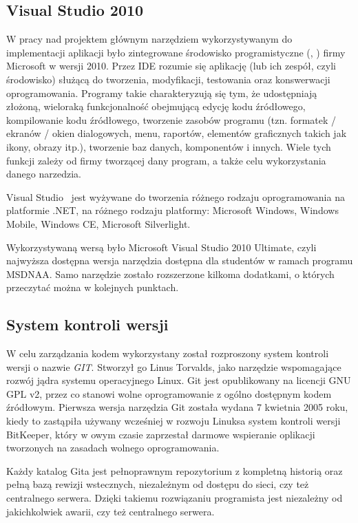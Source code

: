 \subsection{Visual Studio 2010}
W pracy nad projektem głównym narzędziem wykorzystywanym do implementacji aplikacji było zintegrowane środowisko programistyczne (, ) firmy Microsoft w wersji 2010. Przez IDE rozumie się aplikację (lub ich zespół, czyli środowisko) służącą do tworzenia, modyfikacji, testowania oraz konswerwacji oprogramowania. Programy takie charakteryzują się tym, że udostępniają złożoną, wieloraką funkcjonalność obejmującą edycję kodu źródłowego, kompilowanie kodu źródłowego, tworzenie zasobów programu (tzn. formatek / ekranów / okien dialogowych, menu, raportów, elementów graficznych takich jak ikony, obrazy itp.), tworzenie baz danych, komponentów i innych. Wiele tych funkcji zależy od firmy tworzącej dany program, a także celu wykorzystania danego narzedzia.

Visual Studio~\cite{ms:visualStudio} jest wyżywane do tworzenia różnego rodzaju oprogramowania na platformie .NET, na różnego rodzaju platformy: Microsoft Windows, Windows Mobile, Windows CE, Microsoft Silverlight.

Wykorzystywaną wersą było Microsoft Visual Studio 2010 Ultimate, czyli najwyższa dostępna wersja narzędzia dostępna dla studentów w ramach programu MSDNAA. Samo narzędzie zostało rozszerzone kilkoma dodatkami, o których przeczytać można w kolejnych punktach.

\subsection{System kontroli wersji}
W celu zarządzania kodem wykorzystany został rozproszony system kontroli wersji o nazwie \emph{GIT}. Stworzył go Linus Torvalds, jako narzędzie wspomagające rozwój jądra systemu operacyjnego Linux. Git jest opublikowany na licencji GNU GPL v2, przez co stanowi wolne oprogramowanie z ogólno dostępnym kodem źródłowym. Pierwsza wersja narzędzia Git została wydana 7 kwietnia 2005 roku, kiedy to zastąpiła używany wcześniej w rozwoju Linuksa system kontroli wersji BitKeeper, który w owym czasie zaprzestał darmowe wspieranie oplikacji tworzonych na zasadach wolnego oprogramowania.

Każdy katalog Gita jest pełnoprawnym repozytorium z kompletną historią oraz pełną bazą rewizji wstecznych, niezależnym od dostępu do sieci, czy też centralnego serwera. Dzięki takiemu rozwiązaniu programista jest niezależny od jakichkolwiek awarii, czy też centralnego serwera. 

